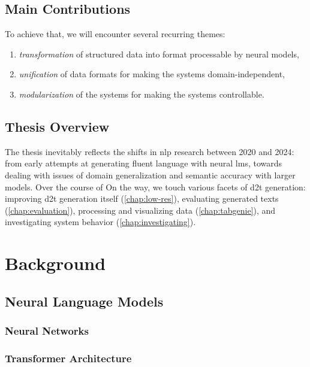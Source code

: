 \documentclass[12pt,notitlepage,a4paper,openright]{report}
\begin{document}
\section{Main Contributions}
\label{sec:contributions}


To achieve that, we will encounter several recurring themes:
\begin{enumerate}
  \item \textit{transformation} of structured data into format processable by neural models,
  \item \textit{unification} of data formats for making the systems domain-independent,
  \item \textit{modularization} of the systems for making the systems controllable.
\end{enumerate}



\section{Thesis Overview}
\label{sec:overview}


The thesis inevitably reflects the shifts in \ac{nlp} research between 2020 and 2024: from early attempts at generating fluent language with neural \acp{lm}, towards dealing with issues of domain generalization and semantic accuracy with larger models.
Over the course of
On the way, we touch various facets of \ac{d2t} generation: improving \ac{d2t} generation itself (\autoref{chap:low-res}), evaluating generated texts (\autoref{chap:evaluation}), processing and visualizing data (\autoref{chap:tabgenie}), and investigating system behavior (\autoref{chap:investigating}).

\chapter{Background}
\label{chap:background}
\section{Neural Language Models}
\label{sec:lms}
\subsection{Neural Networks}
\label{sec:nns}
\subsection{Transformer Architecture}
\label{sec:transformer}
\end{document}
